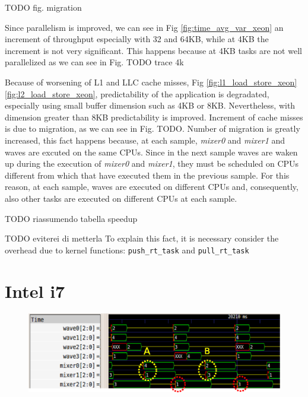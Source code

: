 TODO fig. migration

Since parallelism is improved, we can see in Fig \ref{fig:time_avg_var_xeon} an increment of throughput especially with 32 and 64KB, while at 4KB the 
increment is not very significant. This happens because at 4KB tasks are not well parallelized as we can see in Fig. TODO trace 4k

Because of worsening of L1 and LLC cache misses, Fig \ref{fig:l1_load_store_xeon} \ref{fig:l2_load_store_xeon}, predictability of the application is 
degradated, especially using small buffer dimension such as 4KB or 8KB. Nevertheless, with dimension greater than 8KB predictability is improved. Increment 
of cache misses is due to migration, as we can see in Fig. TODO. Number of migration is greatly increased, this fact happens because, at each sample, 
\textit{mixer0} and \textit{mixer1} and waves are excuted on the same CPUs. Since in the next sample waves are waken up during the execution of 
\textit{mixer0} and \textit{mixer1}, they must be scheduled on CPUs different from which that have executed them in the previous sample. For this reason, 
at each sample, waves are executed on different CPUs and, consequently, also other tasks are executed on different CPUs at each sample.

TODO riassumendo tabella speedup

TODO eviterei di metterla
 To explain this fact, it is necessary consider the overhead due to kernel 
functions: \texttt{push\_rt\_task} and \texttt{pull\_rt\_task}


\section{Intel i7}

\begin{figure}[htbp]
\centering
\includegraphics[width=\widefigure]{images/results_xeon/final_xeon.eps}
\caption{}
\label{fig:trace_i7}
\end{figure}

